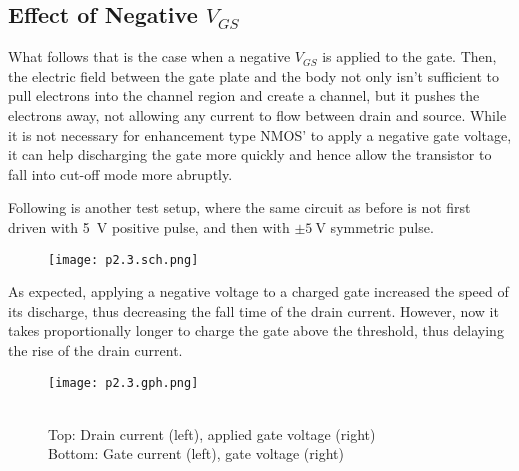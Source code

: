 \documentclass[../main.tex]{subfiles}
\begin{document}
        
    \subsection{Effect of Negative $V_{GS}$}
        What follows that is the case when a negative $V_{GS}$ is applied to the gate. Then, the electric field between 
        the gate plate and the body not only isn't sufficient to pull electrons into the channel region and create a 
        channel, but it pushes the electrons away, not allowing any current to flow between drain and source. While 
        it is not necessary for enhancement type NMOS' to apply a negative gate voltage, it can help discharging the 
        gate more quickly and hence allow the transistor to fall into cut-off mode more abruptly.

        Following is another test setup, where the same circuit as before is not first driven with \SI{5}{\volt} positive 
        pulse, and then with $\pm\SI{5}{\volt}$ symmetric pulse.

        \begin{figure}[H]\centering
            \texttt{[image: p2.3.sch.png]}
            \caption{}\label{fig:p2.3.sch}
        \end{figure}

        As expected, applying a negative voltage to a charged gate increased the speed of its discharge, thus decreasing 
        the fall time of the drain current. However, now it takes proportionally longer to charge the gate above the 
        threshold, thus delaying the rise of the drain current.

        \begin{figure}[H]\centering
            \texttt{[image: p2.3.gph.png]}
            \caption{ \\Top: Drain current (left), applied gate voltage (right)\\
                        Bottom: Gate current (left), gate voltage (right) }\label{fig:p2.3.gph}
        \end{figure}

        
\end{document}
